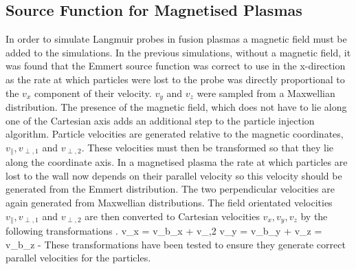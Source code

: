\subsection{Source Function for Magnetised Plasmas}
In order to simulate Langmuir probes in fusion plasmas a magnetic field must be added to the simulations. In the previous simulations, without a magnetic field, it was found that the Emmert source function was correct to use in the x-direction as the rate at which particles were lost to the probe was directly proportional to the $v_x$ component of their velocity. $v_y$ and $v_z$ were sampled from a Maxwellian distribution. The presence of the magnetic field, which does not have to lie along one of the Cartesian axis adds an additional step to the particle injection algorithm. Particle velocities are generated relative to the magnetic coordinates, $v_\parallel , v_{\perp ,1}$ and $v_{\perp ,2}$. These velocities must then be transformed so that they lie along the coordinate axis. In a magnetised plasma the rate at which particles are lost to the wall now depends on their parallel velocity so this velocity should be generated from the Emmert distribution. The two perpendicular velocities are again generated from Maxwellian distributions. The field orientated velocities $v_\parallel , v_{\perp ,1}$ and $v_{\perp ,2}$ are then converted to Cartesian velocities $v_x , v_y , v_z$ by the following transformations \cite{M-Komm}.
\be 
v_x = v_\parallel b_x + v_{\perp ,2} 
\ee
\be
v_y = v_\parallel b_y + 
\ee
%
%
\be 
v_z = v_\parallel b_z  - 
\ee
These transformations have been tested to ensure they generate correct parallel velocities for the particles.

